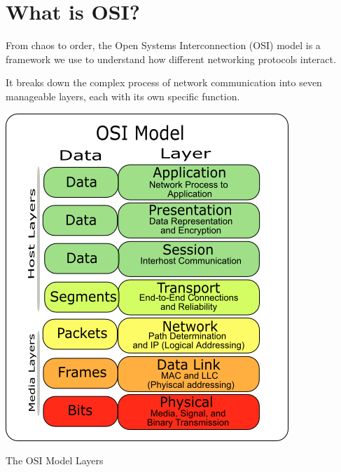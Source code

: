 
\section{What is OSI?}
\begin{minipage}{0.6\textwidth}
From chaos to order, the Open Systems Interconnection (OSI) model is a framework we use to understand how different networking protocols interact. 

\vspace{1em}

It breaks down the complex process of network communication into seven manageable layers, each with its own specific function.

\end{minipage}
\hfill
\begin{minipage}{0.35\textwidth}
    \centering
    \includegraphics[width=\textwidth]{assets/osi/layers.png}
    \caption{The OSI Model Layers}
    \label{fig:osi_layers_intro}
\end{minipage}

